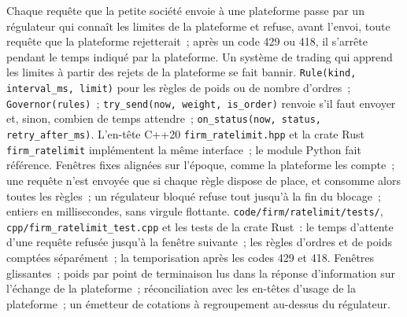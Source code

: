 \begin{build}
 Chaque requête que la petite société envoie à une plateforme passe par un régulateur qui connaît les
limites de la plateforme et refuse, avant l'envoi, toute requête que la plateforme rejetterait~; après un code 429 ou 418, il
s'arrête pendant le temps indiqué par la plateforme. Un système de trading qui apprend les limites à partir des rejets de la plateforme se fait bannir.
 \texttt{Rule(kind, interval\_ms, limit)} pour les règles de poids ou de nombre d'ordres~;
\texttt{Governor(rules)}~; \texttt{try\_send(now, weight, is\_order)} renvoie s'il faut envoyer et, sinon,
combien de temps attendre~; \texttt{on\_status(now, status, retry\_after\_ms)}. L'en-tête C++20 \texttt{firm\_ratelimit.hpp}
et la crate Rust \texttt{firm\_ratelimit} implémentent la même interface~; le module Python fait référence.
 Fenêtres fixes alignées sur l'époque, comme la plateforme les compte~; une requête n'est envoyée que si chaque règle
dispose de place, et consomme alors toutes les règles~; un régulateur bloqué refuse tout jusqu'à la fin du blocage~; entiers
en millisecondes, sans virgule flottante.
 \texttt{code/firm/ratelimit/tests/}, \texttt{cpp/firm\_ratelimit\_test.cpp} et les
tests de la crate Rust~: le temps d'attente d'une requête refusée jusqu'à la fenêtre suivante~; les règles d'ordres et de poids comptées
séparément~; la temporisation après les codes 429 et 418.
 Fenêtres glissantes~; poids par point de terminaison lus dans la réponse d'information sur l'échange de la plateforme~;
réconciliation avec les en-têtes d'usage de la plateforme~; un émetteur de cotations à regroupement au-dessus du régulateur.
\end{build}

\label{lst:m3:centralised-exchanges:governor}

